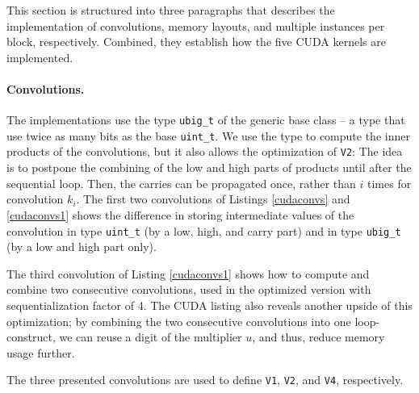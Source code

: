 This section is structured into three paragraphs that describes the
implementation of convolutions, memory layouts, and multiple instances per
block, respectively. Combined, they establish how the five CUDA kernels are
implemented.

\paragraph{Convolutions.}
The implementations use the type \texttt{ubig\_t} of the generic base class -- a
type that use twice as many bits as the base \texttt{uint\_t}. We use the type
to compute the inner products of the convolutions, but it also allows the
optimization of \texttt{V2}: The idea is to postpone the combining of the low
and high parts of products until after the sequential loop. Then, the carries
can be propagated once, rather than $i$ times for convolution $k_i$. The first
two convolutions of Listings \ref{cudaconvs} and \ref{cudaconvs1} shows the
difference in storing intermediate values of the convolution in type
\texttt{uint\_t} (by a low, high, and carry part) and in type \texttt{ubig\_t}
(by a low and high part only).

The third convolution of Listing \ref{cudaconvs1} shows how
to compute and combine two consecutive convolutions, used in the optimized
version with sequentialization factor of 4. The CUDA listing also reveals
another upside of this optimization; by combining the two consecutive
convolutions into one loop-construct, we can reuse a digit of the multiplier
$u$, and thus, reduce memory usage further.

The three presented convolutions are used to define \texttt{V1}, \texttt{V2},
and \texttt{V4}, respectively.

